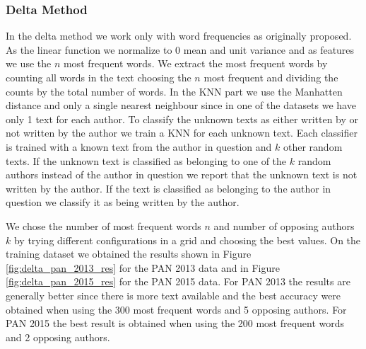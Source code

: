 
\subsubsection{Delta Method}
In the delta method we work only with word frequencies as originally proposed.
As the linear function we normalize to 0 mean and unit variance and as features
we use the $n$ most frequent words. We extract the most frequent words by
counting all words in the text choosing the $n$ most frequent and dividing the
counts by the total number of words. In the \gls{KNN} part we use the Manhatten
distance and only a single nearest neighbour since in one of the datasets we
have only 1 text for each author. To classify the unknown texts as either
written by or not written by the author we train a \gls{KNN} for each unknown
text.  Each classifier is trained with a known text from the author in question
and $k$ other random texts. If the unknown text is classified as belonging
to one of the $k$ random authors instead of the author in question we report
that the unknown text is not written by the author. If the text is classified
as belonging to the author in question we classify it as being written by the
author.

We chose the number of most frequent words $n$ and number of opposing
authors $k$ by trying different configurations in a grid and choosing the
best values. On the training dataset we obtained the results shown in
Figure \ref{fig:delta_pan_2013_res} for the PAN 2013 data and in Figure
\ref{fig:delta_pan_2015_res} for the PAN 2015 data. For PAN 2013 the results are
generally better since there is more text available and the best accuracy were
obtained when using the 300 most frequent words and 5 opposing authors. For PAN
2015 the best result is obtained when using the 200 most frequent words and 2
opposing authors.

